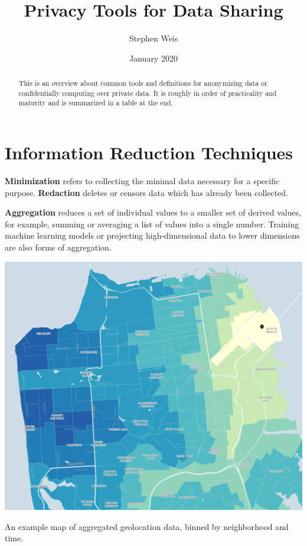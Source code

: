 \documentclass[nobib]{tufte-handout}
\title{Privacy Tools for Data Sharing}
\author[Stephen Weis]{Stephen Weis}
\date{January 2020} %
\begin{document}
\maketitle %

\begin{abstract}

\noindent This is an overview about common tools and definitions
for anonymizing data or confidentially computing over private data.
It is roughly in order of practicality and maturity and is summarized in a
table at the end.
\end{abstract}

\section{Information Reduction Techniques}

\textbf{Minimization} refers to collecting the minimal data necessary for
a specific purpose. \textbf{Redaction} deletes or censors data which has
already been collected.

\textbf{Aggregation} reduces a set of individual values to a smaller set of
derived values, for example, summing or averaging a list of values into a single
number. Training machine learning models or projecting high-dimensional data to
lower dimensions are also forms of aggregation.

\begin{marginfigure} \includegraphics[width=\linewidth]{binned}
\caption{An example map of aggregated geolocation data, binned by neighborhood
and time.}
\label{fig:binned} \end{marginfigure}
\end{document}
